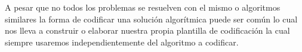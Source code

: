 A pesar que no todos los problemas se resuelven con el mismo o algoritmos similares la forma de codificar una solución algorítmica puede ser común lo cual nos lleva a construir o elaborar nuestra propia plantilla de codificación la cual siempre usaremos independientemente del algoritmo a codificar.